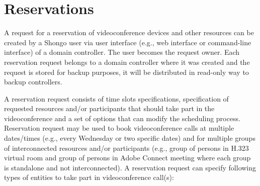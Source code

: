 \chapter{Reservations}

A request for a reservation of videoconference devices and other resources can be created by a Shongo user via user interface (e.g., web interface or command-line interface) of a domain controller. The user becomes the request owner. Each reservation request belongs to a domain controller where it was created and the request is stored for backup purposes, it will be distributed in read-only way to backup controllers.  

A reservation request consists of time slots specifications, specification of requested resources and/or participants that should take part in the videoconference and a set of options that can modify the scheduling process. Reservation request may be used to book videoconference calls at multiple dates/times (e.g., every Wednesday or two specific dates) and for multiple groups of interconnected resources and/or participants (e.g., group of persons in H.323 virtual room and group of persons in Adobe Connect meeting where each group is standalone and not interconnected). A reservation request can specify following types of entities to take part in videoconference call(s):
